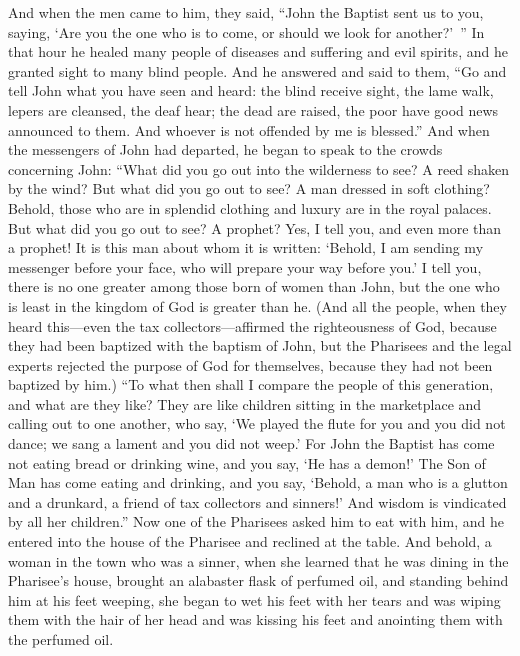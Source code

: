 \begin{biblechapter}
\verse And when the men came to him, they said, “John the Baptist sent us to you, saying, ‘Are you the one who is to come, or should we look for another?’ ”
\verse In that hour he healed many people of diseases and suffering and evil spirits, and he granted sight to many blind people.
\verse And he answered and said to them, “Go and tell John what you have seen and heard: the blind receive sight, the lame walk, lepers are cleansed, the deaf hear; the dead are raised, the poor have good news announced to them.
\verse And whoever is not offended by me is blessed.”
\verse And when the messengers of John had departed, he began to speak to the crowds concerning John: “What did you go out into the wilderness to see? A reed shaken by the wind?
\verse But what did you go out to see? A man dressed in soft clothing? Behold, those who are in splendid clothing and luxury are in the royal palaces.
\verse But what did you go out to see? A prophet? Yes, I tell you, and even more than a prophet!
\verse It is this man about whom it is written: ‘Behold, I am sending my messenger before your face, 
who will prepare your way before you.’
\verse I tell you, there is no one greater among those born of women than John, but the one who is least in the kingdom of God is greater than he.
\verse (And all the people, when they heard this—even the tax collectors—affirmed the righteousness of God, because they had been baptized with the baptism of John,
\verse but the Pharisees and the legal experts rejected the purpose of God for themselves, because they had not been baptized by him.)
\verse “To what then shall I compare the people of this generation, and what are they like?
\verse They are like children sitting in the marketplace and calling out to one another, who say, ‘We played the flute for you and you did not dance; 
we sang a lament and you did not weep.’
\verse For John the Baptist has come not eating bread or drinking wine, and you say, ‘He has a demon!’
\verse The Son of Man has come eating and drinking, and you say, ‘Behold, a man who is a glutton and a drunkard, a friend of tax collectors and sinners!’
\verse And wisdom is vindicated by all her children.”
 Now one of the Pharisees asked him to eat with him, and he entered into the house of the Pharisee and reclined at the table.
\verse And behold, a woman in the town who was a sinner, when she learned that he was dining in the Pharisee’s house, brought an alabaster flask of perfumed oil,
\verse and standing behind him at his feet weeping, she began to wet his feet with her tears and was wiping them with the hair of her head and was kissing his feet and anointing them with the perfumed oil.

\end{biblechapter}

